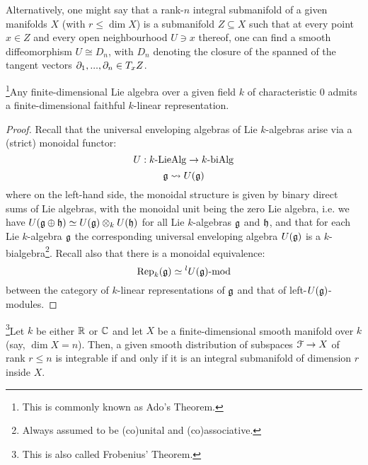         \begin{remark} \label{remark: integral_submanifolds_in_terms_of_local_coordinates}
            Alternatively, one might say that a rank-$n$ integral submanifold of a given manifolds $X$ (with $r \leq \dim X$) is a submanifold $Z \subseteq X$ such that at every point $x \in Z$ and every open neighbourhood $U \ni x$ thereof, one can find a smooth diffeomorphism $U \cong D_n$, with $D_n$ denoting the closure of the spanned of the tangent vectors $\partial_1, ..., \partial_n \in T_xZ$.
        \end{remark}
        \begin{lemma} \label{lemma: embedding_finite_dimensional_lie_algebras_into_matrix_algebras}
            \footnote{This is commonly known as Ado's Theorem.}Any finite-dimensional Lie algebra over a given field $k$ of characteristic $0$ admits a finite-dimensional faithful $k$-linear representation.
        \end{lemma}
            \begin{proof}
                Recall that the universal enveloping algebras of Lie $k$-algebras arise via a (strict) monoidal functor:
                    $$U: k\text{-}\mathrm{Lie}\mathrm{Alg} \to k\text{-}\mathrm{bi}\mathrm{Alg}$$
                    $$\mathfrak{g} \leadsto U(\mathfrak{g})$$
                where on the left-hand side, the monoidal structure is given by binary direct sums of Lie algebras, with the monoidal unit being the zero Lie algebra, i.e. we have $U(\g \oplus \h) \cong U(\g) \tensor_k U(\h)$ for all Lie $k$-algebras $\mathfrak{g}$ and $\mathfrak{h}$, and that for each Lie $k$-algebra $\mathfrak{g}$ the corresponding universal enveloping algebra $U(\mathfrak{g})$ is a $k$-bialgebra\footnote{Always assumed to be (co)unital and (co)associative.}. Recall also that there is a monoidal equivalence:
                    $$\mathrm{Rep}_k(\mathfrak{g}) \simeq {}^lU(\mathfrak{g})\text{-}\mathrm{mod}$$
                between the category of $k$-linear representations of $\mathfrak{g}$ and that of left-$U(\mathfrak{g})$-modules.
            \end{proof}
        \begin{proposition} \label{prop: an_integrability_criterion_for_distributions}
            \footnote{This is also called Frobenius' Theorem.}Let $k$ be either $\mathbb{R}$ or $\mathbb{C}$ and let $X$ be a finite-dimensional smooth manifold over $k$ (say, $\dim X = n$). Then, a given smooth distribution of subspaces $\mathcal{F} \to X$ of rank $r \leq n$ is integrable if and only if it is an integral submanifold of dimension $r$ inside $X$.
        \end{proposition}

